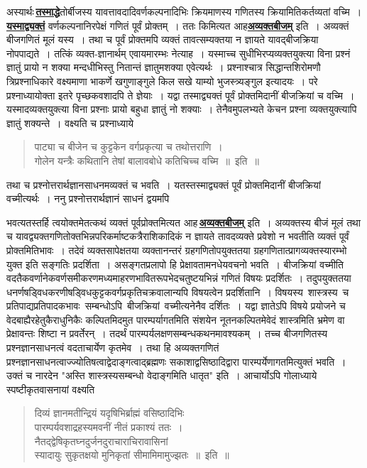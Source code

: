 \documentclass[11pt, openany]{book}
\begin{document}
अस्यार्थः\textendash \,\hyperref[2]{\textbf{तस्माद्धे}}तोर्बीजस्य यावत्तावदादिवर्णकल्पनादिभिः
क्रियमाणस्य गणितस्य क्रियामितिकर्तव्यतां वच्मि~। \hyperref[2]{\textbf{यस्माद्व्यक्तं}}
वर्णकल्पनानिरपेक्षं गणितं पूर्वं प्रोक्तम्~। ततः किमित्यत आह\textemdash  \hyperref[2]{\textbf{अव्यक्तबीजम्}} इति~। अव्यक्तं बीजगणितं मूलं यस्य~। तथा च पूर्वं प्रोक्तमपि व्यक्तं तावत्सम्यक्तया न ज्ञायते यावद्बीजक्रिया नोपपाद्यते~। तत्किं व्यक्त-ज्ञानार्थम् एवायमारम्भः नेत्याह~। यस्माच्च सुधीभिरप्यव्यक्तयुक्त्या विना प्रश्नं ज्ञातुं प्रायो न शक्या
मन्दधीभिस्तु नितान्तं ज्ञातुमशक्या एवेत्यर्थः~। प्रश्नाश्चात्र सिद्धान्तशिरोमणौ
त्रिप्रश्नाधिकारे वक्ष्यमाणा भाकर्णे खगुणाङ्गुले किल सखे याम्यो भुजस्त्र्यङ्गुल इत्यादयः~। 
परे प्रश्नाध्यायोक्ता इतरे पृच्छकवशादपि ते ज्ञेयाः~। यद्वा तस्माद्व्यक्तं पूर्वं
प्रोक्तमिदानीं बीजक्रियां च वच्मि~। यस्मादव्यक्तयुक्त्या विना प्रश्नाः प्रायो बहुधा
ज्ञातुं नो शक्याः~। तेनैवमुपलभ्यते केचन प्रश्ना व्यक्तयुक्त्यापि ज्ञातुं शक्यन्ते~।
वक्ष्यति च प्रश्नाध्याये\textemdash 
\begin{quote}
    \q
     पाट्या च बीजेन च कुट्टकेन वर्गप्रकृत्या च तथोत्तराणि~। \\
 गोलेन यन्त्रैः कथितानि तेषां बालावबोधे कतिचिच्च वच्मि~॥~इति~॥
\end{quote}

तथा च प्रश्नोत्तरार्थज्ञानसाधनमव्यक्तं च भवति~। यतस्तस्माद्व्यक्तं
पूर्वं प्रोक्तमिदानीं बीजक्रियां वच्मीत्यर्थः~। ननु
प्रश्नोत्तरार्थज्ञानं साधनं द्वयमपि
\newpage 

\noindent भवत्यतस्तर्हि त्वयोक्तमेतत्कथं व्यक्तं पूर्वप्रोक्तमित्यत
आह\textendash \,\hyperref[2]{\textbf{अव्यक्तबीजम्}} इति~।
अव्यक्तस्य बीजं मूलं तथा च यावद्व्यक्तगणितोक्तभिन्नपरिकर्माष्टकत्रैराशिकादिकं न ज्ञायते तावदव्यक्ते प्रवेशो न भवतीति व्यक्तं पूर्वं प्रोक्तमितिभावः~। तदेवं
व्यक्तसापेक्षतया व्यक्तानन्तरं ग्रहगणितोपयुक्ततया
ग्रहगणितात्प्रागव्यक्तस्यारम्भो युक्त इति सङ्गतिः प्रदर्शिता~। असङ्गतप्रलापो हि प्रेक्षावतामनधेयवचनो भवति~। बीजक्रियां वच्मीति वदतैकवर्णानेकवर्णसमीकरणमध्यमाहरणभावितरूपभेदचतुष्टयभिन्नं गणितं विषयः प्रदर्शितः~। तदुपयुक्ततया धनर्णषड्विधकरणीषड्विधकुट्टकवर्गप्रकृतिचक्रवालान्यपि विषयत्वेन प्रदर्शितानि~। 
विषयस्य \,शास्त्रस्य \,च \,प्रतिपाद्यप्रतिपादकभावः \,सम्बन्धोऽपि \,बीजक्रियां \,वच्मीत्यनेनैव दर्शितः~।
यद्वा ज्ञातेऽपि विषये प्रयोजने च वेदबाह्यैरहेतुकैराधुनिकैः
कल्पितमिदमुत पारम्पर्यागतमिति संशयेन नूतनकल्पितमेवेदं शास्त्रमिति भ्रमेण वा
प्रेक्षावन्तः शिष्टा न प्रवर्तेरन्~। तदर्थं पारम्पर्यलक्षणसम्बन्धकथनमावश्यकम्~। तच्च
बीजगणितस्य प्रश्नज्ञानसाधनत्वं वदताचार्येण कृतमेव~। तथा हि अव्यक्तगणितं प्रश्नज्ञानसाधनत्वाज्ज्योतिषत्वाद्वेदाङ्गत्वाद्ब्रह्मणः
सकाशाद्वसिष्ठादिद्वारा पारम्पर्येणागतमित्युक्तं भवति~। उक्तं च नारदेन {\qt "अस्ति शास्त्रस्यसम्बन्धो वेदाङ्गमिति धातृत"} इति~। आचार्योऽपि गोलाध्याये स्पष्टीकृतवासनायां
वक्ष्यति\textemdash 
\begin{quote}
    \q
    दिव्यं ज्ञानमतीन्द्रियं यदृषिभिर्ब्राह्मं वसिष्ठादिभिः\\
 पारम्पर्यवशाद्रहस्यमवनीं नीतं प्रकाश्यं ततः~।\\
 नैतद्द्वेषिकृतघ्नदुर्जनदुराचाराचिरावासिनां\\
 स्यादायुः सुकृतक्षयो मुनिकृतां सीमामिमामुज्झतः~॥~इति~॥
\end{quote}
 
\end{document}
